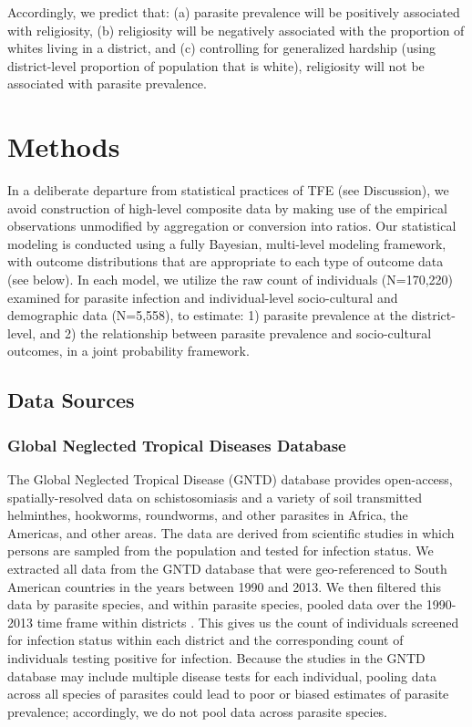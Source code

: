 \documentclass[12pt]{article}
\begin{document}
 Accordingly, we predict that: (a) parasite prevalence will be positively associated with religiosity, (b) religiosity will be negatively associated with the proportion of whites living in a district, and (c) controlling for generalized hardship (using district-level proportion of population that is white), religiosity will not be associated with parasite prevalence.
  
\section{Methods}
In a deliberate departure from statistical practices of TFE (see Discussion), we avoid construction of high-level composite data by making use of the empirical observations unmodified by aggregation or conversion into ratios.  Our statistical modeling is conducted using a fully Bayesian, multi-level modeling framework, with outcome distributions \citep{stan-manual:2013} that are appropriate to each type of outcome data (see below). In each model, we utilize the raw count of individuals (N=170,220) examined for parasite infection and individual-level socio-cultural and demographic data (N=5,558), to estimate: 1) parasite prevalence at the district-level, and 2) the relationship between parasite prevalence and socio-cultural outcomes, in a joint probability framework. 

\subsection{Data Sources}
\subsubsection{Global Neglected Tropical Diseases Database}
	The Global Neglected Tropical Disease (GNTD) database \citep{Hurlimann2011} provides open-access, spatially-resolved data on schistosomiasis and a variety of soil transmitted helminthes, hookworms, roundworms, and other parasites in Africa, the Americas, and other areas.  The data are derived from scientific studies in which persons are sampled from the population and tested for infection status.  We extracted all data from the GNTD database that were geo-referenced to South American countries in the years between 1990 and 2013.  We then filtered this data by parasite species, and within parasite species, pooled data over the 1990-2013 time frame within districts  \cite[i.e. we treat the data from each geographically-localized scientific study as a component of a lower-level cluster in a multi-level cluster sample,][]{hughes1996cluster}.  This gives us the count of individuals screened for infection status within each district and the corresponding count of individuals testing positive for infection. Because the studies in the GNTD database may include multiple disease tests for each individual, pooling data across all species of parasites could lead to poor or biased estimates of parasite prevalence; accordingly, we do not pool data across parasite species.
 
\end{document}
